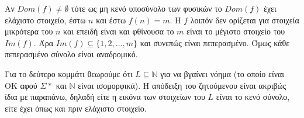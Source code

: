 \documentclass[11pt]{article}
\begin{document}
Αν $Dom(f)\neq\emptyset$ τότε ως μη κενό υποσύνολο των φυσικών το $Dom(f)$ έχει ελάχιστο στοιχείο, έστω $n$ 
και έστω $f(n) = m$. Η $f$ λοιπόν δεν ορίζεται για στοιχεία μικρότερα του $n$ και επειδή είναι και φθίνουσα
το $m$ είναι το μέγιστο στοιχείο του $Im(f)$. Άρα $Im(f) \subseteq \{1,2,\ldots,m\}$ και συνεπώς είναι 
πεπερασμένο. Όμως κάθε πεπερασμένο σύνολο είναι αναδρομικό.

Για το δεύτερο κομμάτι θεωρούμε ότι $L\subseteq\mathbb{N}$ για να βγαίνει νόημα (το οποίο είναι OK αφού  
$\Sigma*$ και $\mathbb{N}$ είναι ισομορφικά). Η απόδειξη του ζητούμενου είναι ακριβώς ίδια με παραπάνω, 
δηλαδή είτε η εικόνα των στοιχείων του $L$ είναι το κενό σύνολο, είτε έχει όπως και πριν ελάχιστο στοιχείο.

\end{document}
